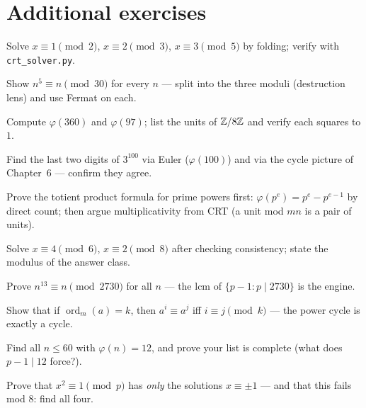 \section{Additional exercises}
\begin{exercise}[easy]
Solve $x \equiv 1 \pmod 2$, $x \equiv 2 \pmod 3$, $x \equiv 3 \pmod 5$
by folding; verify with \texttt{crt\_solver.py}.
\end{exercise}
\begin{exercise}[easy]
Show $n^5 \equiv n \pmod{30}$ for every $n$ --- split into the three
moduli (destruction lens) and use Fermat on each.
\end{exercise}
\begin{exercise}[easy]
Compute $\varphi(360)$ and $\varphi(97)$; list the units of $\mathbb{Z}/8\mathbb{Z}$ and
verify each squares to $1$.
\end{exercise}
\begin{exercise}[easy]
Find the last two digits of $3^{100}$ via Euler ($\varphi(100)$) and via
the cycle picture of Chapter~6 --- confirm they agree.
\end{exercise}
\begin{exercise}[medium]
Prove the totient product formula for prime powers first:
$\varphi(p^e) = p^e - p^{e-1}$ by direct count; then argue
multiplicativity from CRT (a unit mod $mn$ is a pair of units).
\end{exercise}
\begin{exercise}[medium]
Solve $x \equiv 4 \pmod 6$, $x \equiv 2 \pmod 8$ after checking
consistency; state the modulus of the answer class.
\end{exercise}
\begin{exercise}[medium]
Prove $n^{13} \equiv n \pmod{2730}$ for all $n$ --- the lcm of
$\{p-1 : p \mid 2730\}$ is the engine.
\end{exercise}
\begin{exercise}[medium]
Show that if $\operatorname{ord}_m(a) = k$, then $a^i \equiv a^j$ iff
$i \equiv j \pmod k$ --- the power cycle is exactly a cycle.
\end{exercise}
\begin{exercise}[hard]
Find all $n \le 60$ with $\varphi(n) = 12$, and prove your list is
complete (what does $p - 1 \mid 12$ force?).
\end{exercise}
\begin{exercise}[hard]
Prove that $x^2 \equiv 1 \pmod p$ has \emph{only} the solutions
$x \equiv \pm 1$ --- and that this fails mod $8$: find all four.
\end{exercise}
